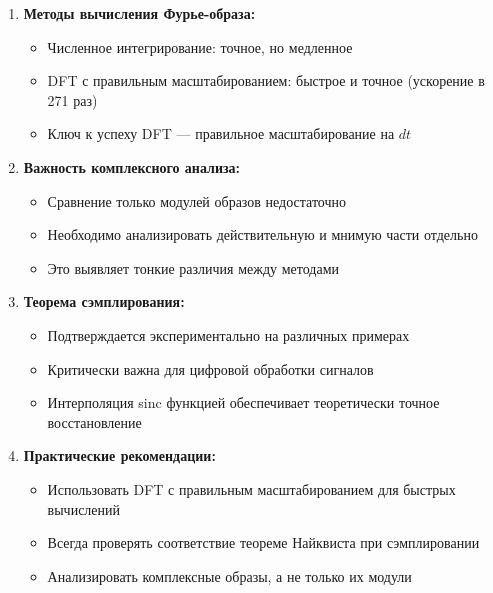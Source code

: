 \begin{enumerate}
    \item \textbf{Методы вычисления Фурье-образа:}
    \begin{itemize}
        \item Численное интегрирование: точное, но медленное
        \item DFT с правильным масштабированием: быстрое и точное (ускорение в 271 раз)
        \item Ключ к успеху DFT — правильное масштабирование на $dt$
    \end{itemize}
    
    \item \textbf{Важность комплексного анализа:}
    \begin{itemize}
        \item Сравнение только модулей образов недостаточно
        \item Необходимо анализировать действительную и мнимую части отдельно
        \item Это выявляет тонкие различия между методами
    \end{itemize}
    
    \item \textbf{Теорема сэмплирования:}
    \begin{itemize}
        \item Подтверждается экспериментально на различных примерах
        \item Критически важна для цифровой обработки сигналов
        \item Интерполяция sinc функцией обеспечивает теоретически точное восстановление
    \end{itemize}
    
    \item \textbf{Практические рекомендации:}
    \begin{itemize}
        \item Использовать DFT с правильным масштабированием для быстрых вычислений
        \item Всегда проверять соответствие теореме Найквиста при сэмплировании
        \item Анализировать комплексные образы, а не только их модули
    \end{itemize}
\end{enumerate}
